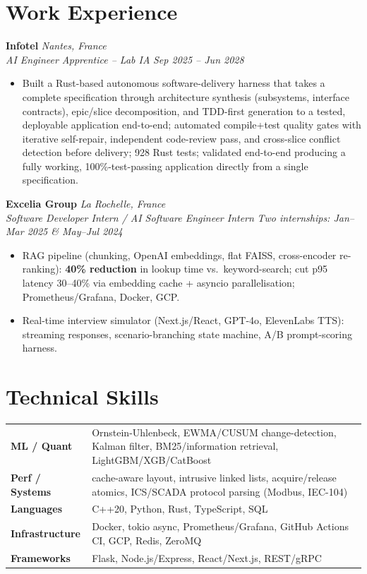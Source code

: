 \documentclass[10pt]{article}
\newcommand{\entry}[4]{%
  \noindent\textbf{#1} \hfill \textit{#2} \\
  \textit{#3} \hfill \textit{#4}\\[-0.3em]
}
\begin{document}
\section*{Work Experience}
\entry{Infotel}{Nantes, France}{AI Engineer Apprentice -- Lab IA}{Sep 2025 -- Jun 2028}
\begin{itemize}
  \item Built a Rust-based autonomous software-delivery harness that takes a complete specification through architecture synthesis (subsystems, interface contracts), epic/slice decomposition, and TDD-first generation to a tested, deployable application end-to-end; automated compile+test quality gates with iterative self-repair, independent code-review pass, and cross-slice conflict detection before delivery; 928 Rust tests; validated end-to-end producing a fully working, 100\%-test-passing application directly from a single specification.
\end{itemize}
\entry{Excelia Group}{La Rochelle, France}{Software Developer Intern / AI Software Engineer Intern}{Two internships: Jan--Mar 2025 \& May--Jul 2024}
\begin{itemize}
  \item RAG pipeline (chunking, OpenAI embeddings, flat FAISS, cross-encoder re-ranking): \textbf{40\% reduction} in lookup time vs.\ keyword-search; cut p95 latency 30--40\% via embedding cache + asyncio parallelisation; Prometheus/Grafana, Docker, GCP.
  \item Real-time interview simulator (Next.js/React, GPT-4o, ElevenLabs TTS): streaming responses, scenario-branching state machine, A/B prompt-scoring harness.
\end{itemize}

\section*{Technical Skills}
\noindent
\begin{tabular}{@{}p{2.7cm}p{15.5cm}@{}}
\textbf{ML / Quant} & Ornstein-Uhlenbeck, EWMA/CUSUM change-detection, Kalman filter, BM25/information retrieval, LightGBM/XGB/CatBoost \\
\textbf{Perf / Systems} & cache-aware layout, intrusive linked lists, acquire/release atomics, ICS/SCADA protocol parsing (Modbus, IEC-104) \\
\textbf{Languages} & C++20, Python, Rust, TypeScript, SQL \\
\textbf{Infrastructure} & Docker, tokio async, Prometheus/Grafana, GitHub Actions CI, GCP, Redis, ZeroMQ \\
\textbf{Frameworks} & Flask, Node.js/Express, React/Next.js, REST/gRPC \\
\end{tabular}
\end{document}
